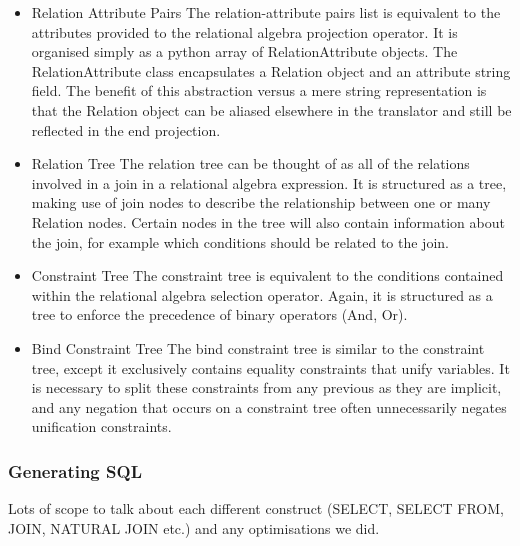 \documentclass[a4paper, 11pt]{article}
\begin{document}
      \begin{itemize}

          \item Relation Attribute Pairs
            The relation-attribute pairs list is equivalent to the attributes
            provided to the relational algebra projection operator. It is
            organised simply as a python array of RelationAttribute objects.
            The RelationAttribute class encapsulates a Relation object and an
            attribute string field. The benefit of this abstraction versus a
            mere string representation is that the Relation object can be
            aliased elsewhere in the translator and still be reflected in the
            end projection.

          \item Relation Tree
            The relation tree can be thought of as all of the relations
            involved in a join in a relational algebra expression. It is
            structured as a tree, making use of join nodes to describe the
            relationship between one or many Relation nodes. Certain nodes in
            the tree will also contain information about the join, for example
            which conditions should be related to the join.

          \item Constraint Tree
            The constraint tree is equivalent to the conditions contained
            within the relational algebra selection operator. Again, it is
            structured as a tree to enforce the precedence of binary operators
            (And, Or).

          \item Bind Constraint Tree
            The bind constraint tree is similar to the constraint tree, except
            it exclusively contains equality constraints that unify variables.
            It is necessary to split these constraints from any previous as
            they are implicit, and any negation that occurs on a constraint
            tree often unnecessarily negates unification constraints.

      \end{itemize}

      \subsubsection{Generating SQL}
      Lots of scope to talk about each different construct (SELECT, SELECT FROM, 
      JOIN, NATURAL JOIN etc.) and any optimisations we did.
\end{document}
